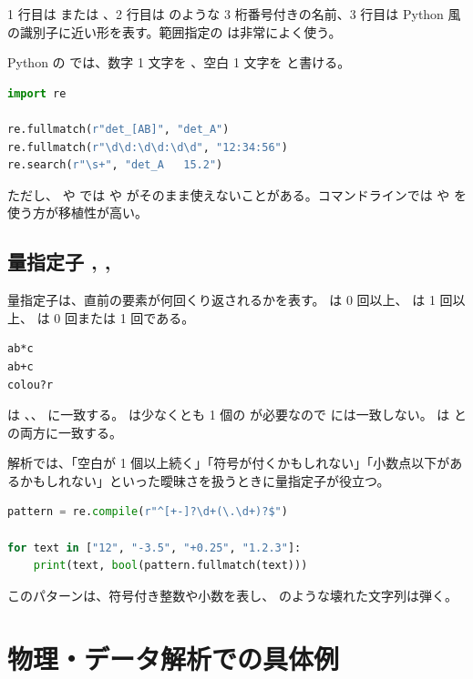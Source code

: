 1 行目は  または 、2 行目は  のような 3 桁番号付きの名前、3 行目は Python 風の識別子に近い形を表す。範囲指定の \code{[0-9]} は非常によく使う。

Python の  では、数字 1 文字を 、空白 1 文字を  と書ける。

\begin{lstlisting}[language=Python]
import re

re.fullmatch(r"det_[AB]", "det_A")
re.fullmatch(r"\d\d:\d\d:\d\d", "12:34:56")
re.search(r"\s+", "det_A   15.2")
\end{lstlisting}

ただし、 や  では  や  がそのまま使えないことがある。コマンドラインでは \code{[0-9]} や \code{[[:space:]]} を使う方が移植性が高い。

\subsection{量指定子 \code{*}, \code{+}, }

量指定子は、直前の要素が何回くり返されるかを表す。\code{*} は 0 回以上、\code{+} は 1 回以上、 は 0 回または 1 回である。

\begin{lstlisting}[numbers=none, xleftmargin=2\zw]
ab*c
ab+c
colou?r
\end{lstlisting}

 は 、、 に一致する。 は少なくとも 1 個の  が必要なので  には一致しない。 は  と  の両方に一致する。

解析では、「空白が 1 個以上続く」「符号が付くかもしれない」「小数点以下があるかもしれない」といった曖昧さを扱うときに量指定子が役立つ。

\begin{lstlisting}[language=Python]
pattern = re.compile(r"^[+-]?\d+(\.\d+)?$")

for text in ["12", "-3.5", "+0.25", "1.2.3"]:
    print(text, bool(pattern.fullmatch(text)))
\end{lstlisting}

このパターンは、符号付き整数や小数を表し、 のような壊れた文字列は弾く。

\section{物理・データ解析での具体例}

